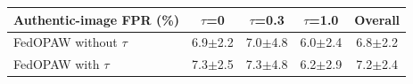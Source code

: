 \begin{tabular}{@{}lcccc@{}}
\toprule
Authentic-image FPR (\%) & $\tau$=0 & $\tau$=0.3 & $\tau$=1.0 & Overall \\
\midrule
FedOPAW without $\tau$ & 6.9$\pm$2.2 & 7.0$\pm$4.8 & 6.0$\pm$2.4 & 6.8$\pm$2.2 \\
FedOPAW with $\tau$ & 7.3$\pm$2.5 & 7.3$\pm$4.8 & 6.2$\pm$2.9 & 7.2$\pm$2.4 \\
\bottomrule
\end{tabular}
